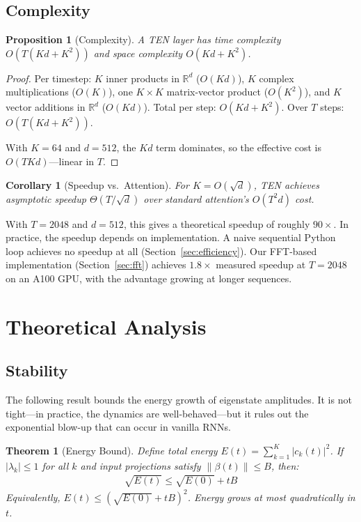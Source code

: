 \documentclass{article}
\newtheorem{theorem}{Theorem}
\newtheorem{proposition}{Proposition}
\newtheorem{corollary}{Corollary}
\begin{document}
\subsection{Complexity}

\begin{proposition}[Complexity]
A TEN layer has time complexity $O(T(Kd + K^2))$ and space complexity $O(Kd + K^2)$.
\end{proposition}

\begin{proof}
Per timestep: $K$ inner products in $\mathbb{R}^d$ ($O(Kd)$), $K$ complex multiplications ($O(K)$), one $K \times K$ matrix-vector product ($O(K^2)$), and $K$ vector additions in $\mathbb{R}^d$ ($O(Kd)$). Total per step: $O(Kd + K^2)$. Over $T$ steps: $O(T(Kd + K^2))$.

With $K = 64$ and $d = 512$, the $Kd$ term dominates, so the effective cost is $O(TKd)$---linear in $T$.
\end{proof}

\begin{corollary}[Speedup vs.\ Attention]
\label{cor:speedup}
For $K = O(\sqrt{d})$, TEN achieves asymptotic speedup $\Theta(T/\sqrt{d})$ over standard attention's $O(T^2 d)$ cost.
\end{corollary}

With $T = 2048$ and $d = 512$, this gives a theoretical speedup of roughly $90\times$. In practice, the speedup depends on implementation. A naive sequential Python loop achieves no speedup at all (Section~\ref{sec:efficiency}). Our FFT-based implementation (Section~\ref{sec:fft}) achieves $1.8\times$ measured speedup at $T = 2048$ on an A100 GPU, with the advantage growing at longer sequences.


\section{Theoretical Analysis}
\label{sec:theory}

\subsection{Stability}

The following result bounds the energy growth of eigenstate amplitudes. It is not tight---in practice, the dynamics are well-behaved---but it rules out the exponential blow-up that can occur in vanilla RNNs.

\begin{theorem}[Energy Bound]
\label{thm:stability}
Define total energy $E(t) = \sum_{k=1}^K |c_k(t)|^2$. If $|\lambda_k| \leq 1$ for all $k$ and input projections satisfy $\|\beta(t)\| \leq B$, then:
\begin{align}
\sqrt{E(t)} \leq \sqrt{E(0)} + tB
\end{align}
Equivalently, $E(t) \leq (\sqrt{E(0)} + tB)^2$. Energy grows at most quadratically in $t$.
\end{theorem}
\end{document}
